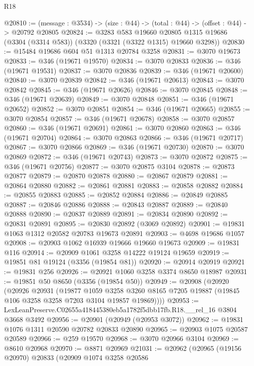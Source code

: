 \begin{lexlean}{R18}
\begin{coremodule}
@20810 := (message : @3534) -> (size : @44) -> (total : @44) -> (offset : @44) -> @20792 @20805
@20824 := @3283
    @583
    @19660
    @20805
    @1315
    @19686
    (@3304 (@3314 @583))
    (@3320 (@3321 (@3322 @1315) @19660 @3298))
@20830 := @15484 @19686 @604 @51 @1313 @20784 @3258
@20831 := @3070 @19673
@20833 := @346 (@19671 @19570)
@20834 := @3070 @20833
@20836 := @346 (@19671 @19531)
@20837 := @3070 @20836
@20839 := @346 (@19671 @20600)
@20840 := @3070 @20839
@20842 := @346 (@19671 @20613)
@20843 := @3070 @20842
@20845 := @346 (@19671 @20626)
@20846 := @3070 @20845
@20848 := @346 (@19671 @20639)
@20849 := @3070 @20848
@20851 := @346 (@19671 @20652)
@20852 := @3070 @20851
@20854 := @346 (@19671 @20665)
@20855 := @3070 @20854
@20857 := @346 (@19671 @20678)
@20858 := @3070 @20857
@20860 := @346 (@19671 @20691)
@20861 := @3070 @20860
@20863 := @346 (@19671 @20704)
@20864 := @3070 @20863
@20866 := @346 (@19671 @20717)
@20867 := @3070 @20866
@20869 := @346 (@19671 @20730)
@20870 := @3070 @20869
@20872 := @346 (@19671 @20743)
@20873 := @3070 @20872
@20875 := @346 (@19671 @20756)
@20877 := @3070 @20875 @3104
@20878 := @20873 @20877
@20879 := @20870 @20878
@20880 := @20867 @20879
@20881 := @20864 @20880
@20882 := @20861 @20881
@20883 := @20858 @20882
@20884 := @20855 @20883
@20885 := @20852 @20884
@20886 := @20849 @20885
@20887 := @20846 @20886
@20888 := @20843 @20887
@20889 := @20840 @20888
@20890 := @20837 @20889
@20891 := @20834 @20890
@20892 := @20831 @20891
@20895 := @20830 @20892 (@3069 @20892)
@20901 := @19831 @1063 @1312 @20582 @20783 @19673 @20891
@20903 := @4698 @19686 @1057
@20908 := @20903 @1062 @16939 @19666 @19660 @19673
@20909 := @19831 @116
@20914 := @20909 @1061 @3258 @14222 @19124 @19659
@20919 := @19851 @81 @19124 (@3356 (@19854 @81))
@20920 := @20914 @20919
@20921 := @19831 @256
@20926 := @20921 @1060 @3258 @3374 @8650 @18987
@20931 := @19851 @50 @8650 (@3356 (@19854 @50))
@20949 := @20908
    (@20920
      (@20926
        @20931
        (@19877
          @1059
          @3258
          @3260
          @8165
          @7205
          @19887
          (@19845 @106 @3258 @3258 @7203 @3104 @19857 @19869))))
@20953 := LexLeanPreserve.C02655a418445380eb5a1782f5dbb17fb.R18.__rel_16 @3804 @3668 @3492
@20956 := @20901 (@20949 (@20953 @3072))
@20962 := @19831 @1076 @1311 @20590 @20782 @20833 @20890
@20965 := @20903 @1075 @20587 @20589
@20966 := @259 @19570
@20968 := @3070 @20966 @3104
@20969 := @8610 @20968
@20970 := @8871 @20969
@21031 := @20962
    (@20965
      (@19156 @20970)
      @20833
      (@20909
        @1074
        @3258
        @20586

\end{coremodule}
\end{lexlean}
